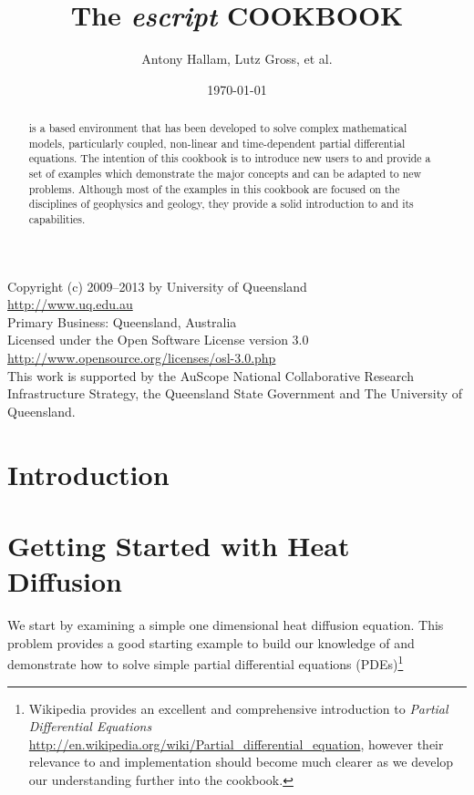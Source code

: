 \documentclass{esysdoc}
\title{The \textit{escript} COOKBOOK}
\author{Antony Hallam, Lutz Gross, et al.}
\date{\today}
\begin{document}
\maketitle

\ifpdf
{}
\fi

\begin{center}
Copyright (c) 2009--2013 by University of Queensland	\\
\url{http://www.uq.edu.au}				\\
Primary Business: Queensland, Australia			\\
Licensed under the Open Software License version 3.0	\\
\url{http://www.opensource.org/licenses/osl-3.0.php}	\\

This work is supported by the AuScope National Collaborative Research Infrastructure Strategy, 
the Queensland State Government and The University of Queensland.

\end{center}

\begin{abstract}
\esc is a \pyt based environment that has been developed to solve complex mathematical models, particularly coupled, non-linear and time-dependent partial differential equations. The intention of this cookbook is to introduce new users to \esc and provide a set of examples which demonstrate the major concepts and can be adapted to new problems. Although most of the examples in this cookbook are focused on the disciplines of geophysics and geology, they provide a solid introduction to \esc and its capabilities.
\end{abstract}


\cleardoublepage{}%
\tableofcontents

\newpage

\chapter{Introduction}
 \label{CHAP INTRO}
 
\chapter{Getting Started with Heat Diffusion}
 \label{CHAP HEAT DIFF}
 We start by examining a simple one dimensional heat diffusion equation. This
 problem provides a good starting example to build our knowledge of \esc and
 demonstrate how to solve simple partial differential equations
 (PDEs)\footnote{Wikipedia provides an excellent and comprehensive
 introduction to \textit{Partial Differential Equations}
 \url{http://en.wikipedia.org/wiki/Partial_differential_equation}, however
 their relevance to \esc and implementation should become much clearer as we
 develop our understanding further into the cookbook.}
 
 
\end{document}
